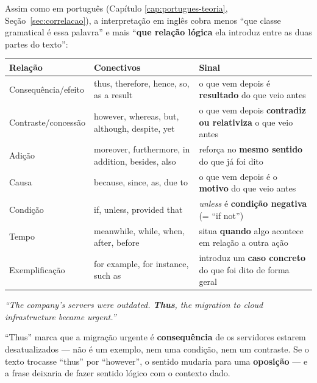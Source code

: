 \begin{conceito}
Assim como em português (Capítulo \ref{cap:portugues-teoria},
Seção~\ref{sec:correlacao}), a interpretação em inglês cobra menos “que
classe gramatical é essa palavra” e mais “\textbf{que relação lógica} ela
introduz entre as duas partes do texto”:

\begin{center}
\begin{tabular}{@{}p{3.2cm}p{4.4cm}p{4cm}@{}}
\toprule
\textbf{Relação} & \textbf{Conectivos} & \textbf{Sinal} \\
\midrule
Consequência/efeito & thus, therefore, hence, so, as a result & o que vem
depois é \textbf{resultado} do que veio antes \\
Contraste/concessão & however, whereas, but, although, despite, yet & o
que vem depois \textbf{contradiz ou relativiza} o que veio antes \\
Adição & moreover, furthermore, in addition, besides, also & reforça no
\textbf{mesmo sentido} do que já foi dito \\
Causa & because, since, as, due to & o que vem depois é o \textbf{motivo}
do que veio antes \\
Condição & if, unless, provided that & \textit{unless} é
\textbf{condição negativa} (= “if not”) \\
Tempo & meanwhile, while, when, after, before & situa \textbf{quando} algo
acontece em relação a outra ação \\
Exemplificação & for example, for instance, such as & introduz um
\textbf{caso concreto} do que foi dito de forma geral \\
\bottomrule
\end{tabular}
\end{center}
\end{conceito}

\begin{exemplo}
\textit{“The company's servers were outdated. \textbf{Thus}, the migration
to cloud infrastructure became urgent.”}

“Thus” marca que a migração urgente é \textbf{consequência} de os
servidores estarem desatualizados --- não é um exemplo, nem uma condição,
nem um contraste. Se o texto trocasse “thus” por “however”, o sentido
mudaria para uma \textbf{oposição} --- e a frase deixaria de fazer sentido
lógico com o contexto dado.
\end{exemplo}

